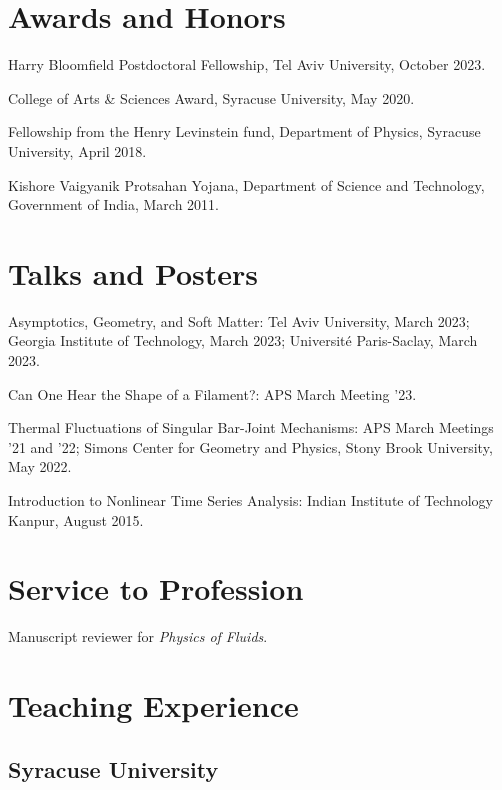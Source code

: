 \documentclass[10pt,a4paper,article,oneside]{memoir}
\def\nohangpars{%
  \leftskip=0pt%
  \parindent=0pt%
  \setsecindent{0pt}%
  \setsubsecindent{0pt}%
}
\begin{document}

\section{Awards and Honors}

Harry Bloomfield Postdoctoral Fellowship, Tel Aviv University, October 2023.

College of Arts \& Sciences Award, Syracuse University, May 2020.

Fellowship from the Henry Levinstein fund, Department of Physics, Syracuse University, April 2018.

Kishore Vaigyanik Protsahan Yojana, Department of Science and Technology, Government of India, March 2011.


\section{Talks and Posters}

Asymptotics, Geometry, and Soft Matter: Tel Aviv University, March 2023; Georgia Institute of Technology, March 2023; Universit\'{e} Paris-Saclay, March 2023.

Can One Hear the Shape of a Filament?: APS March Meeting '23.

Thermal Fluctuations of Singular Bar-Joint Mechanisms: APS March Meetings '21 and '22; Simons Center for Geometry and Physics, Stony Brook University, May 2022.

Introduction to Nonlinear Time Series Analysis: Indian Institute of Technology Kanpur, August 2015.


\nohangpars

\section{Service to Profession}

Manuscript reviewer for \emph{Physics of Fluids}.


\section{Teaching Experience}

\subsection{Syracuse University}
\end{document}
